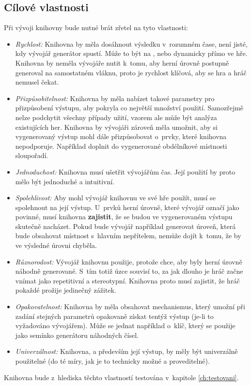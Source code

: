 
\subsection{Cílové vlastnosti}
\label{ssec:cilove_vlastnosti}


Při vývoji knihovny bude nutné brát zřetel na tyto vlastnosti:
\begin{itemize}
    \item \textit{Rychlost:} Knihovna by měla dosáhnout výsledku v~rozumném čase, není jisté, kdy vývojář generátor spustí.
    Může to být na , nebo dynamicky přímo ve hře.
    Knihovna by neměla vývojáře nutit k~tomu, aby herní úrovně postupně generoval na samostatném vláknu, proto je rychlost klíčová, aby se hra  a hráč nemusel čekat.
    \item \textit{Přizpůsobitelnost:} Knihovna by měla nabízet takové parametry pro přizpůsobení výstupu, aby pokryla co největší množství použití.
    Samozřejmě nelze podchytit všechny případy užití, vzorem ale může být analýza existujících her.
    Knihovna by vývojáři zároveň měla umožnit, aby si vygenerovaný výstup mohl dále přizpůsobovat o~prvky, které knihovna nepodporuje.
    Například doplnit do vygenerované obdélníkové místnosti sloupořadí.
    \item \textit{Jednoduchost:} Knihovna musí ušetřit vývojářům čas.
    Její použití by proto mělo být jednoduché a intuitivní.
    \item \textit{Spolehlivost:} Aby mohl vývojář knihovnu ve své hře použít, musí se spolehnout na její výstup.
    U~prvků herní úrovně, které vývojář označí jako povinné, musí knihovna \textbf{zajistit}, že se budou ve vygenerovaném výstupu skutečně nacházet.
    Pokud bude vývojář například generovat úroveň, která bude obsahovat místnost s~hlavním nepřítelem, nemůže dojít k~tomu, že by ve výsledné úrovni chyběla.
    \item \textit{Různorodost:} Vývojář knihovnu použije, protože chce, aby byly herní úrovně náhodně generované.
    S~tím totiž úzce souvisí to, za jak dlouho je hráč začne vnímat jako repetitivní a stereotypní.
    Knihovna proto musí zajistit, že hráč pokaždé prožije jedinečný zážitek.
    \item \textit{Opakovatelnost:} Knihovna by měla obsahovat mechanismus, který umožní při zadání stejných parametrů opakovaně získat tentýž výstup (je-li to vyžadováno vývojářem).
    Může se jednat například o~klíč, který se použije jako semínko generátoru náhodných čísel.
    \item \textit{Univerzálnost:} Knihovna, a především její výstup, by měly být univerzálně použitelné (do té míry, jak je to technicky možné a proveditelné). 
\end{itemize}
Knihovna bude z~hlediska těchto vlastností testována v~kapitole \ref{ch:testovani}.

